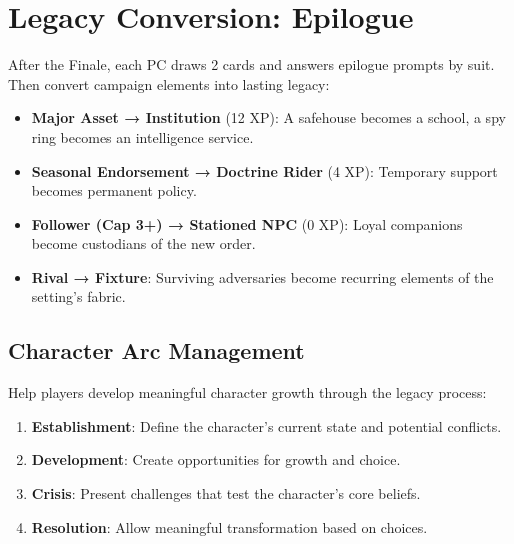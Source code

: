 \section{Legacy Conversion: Epilogue}
\label{sec:legacy-conversion}

After the Finale, each PC draws 2 cards and answers epilogue prompts by suit. Then convert campaign elements into lasting legacy:
\begin{itemize}
  \item \textbf{Major Asset → Institution} (12 XP): A safehouse becomes a school, a spy ring becomes an intelligence service.
  \item \textbf{Seasonal Endorsement → Doctrine Rider} (4 XP): Temporary support becomes permanent policy.
  \item \textbf{Follower (Cap 3+) → Stationed NPC} (0 XP): Loyal companions become custodians of the new order.
  \item \textbf{Rival → Fixture}: Surviving adversaries become recurring elements of the setting’s fabric.
\end{itemize}

\subsection{Character Arc Management}
\label{subsec:character-arcs}

Help players develop meaningful character growth through the legacy process:
\begin{enumerate}
  \item \textbf{Establishment}: Define the character’s current state and potential conflicts.
  \item \textbf{Development}: Create opportunities for growth and choice.
  \item \textbf{Crisis}: Present challenges that test the character’s core beliefs.
  \item \textbf{Resolution}: Allow meaningful transformation based on choices.
\end{enumerate}

